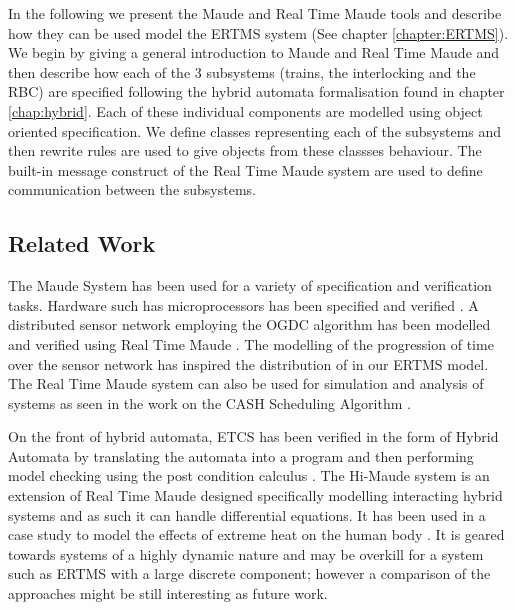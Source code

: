 \newcommand{\rtmaude}{Real Time Maude}


In the following we present the Maude \cite{MC03,Maude} and Real Time Maude \cite{PO02,PO04,RTMaude} tools and describe how they can be used model the ERTMS system (See chapter \ref{chapter:ERTMS}).   We begin by giving a general introduction to Maude and Real Time Maude and then describe how each of the 3 subsystems (trains, the interlocking and the RBC) are specified following the hybrid automata formalisation found in chapter \ref{chap:hybrid}. Each of these individual components are modelled using object oriented specification. We define classes representing each of the subsystems and then rewrite rules are used to give objects from these classses behaviour. The  built-in message construct of the Real Time Maude system are used to define communication between the subsystems.

\subsection*{Related Work}
The Maude System has been used for a variety of specification and verification tasks. Hardware such has microprocessors has been specified and verified \cite{NH00}. A distributed sensor network employing the OGDC algorithm has been modelled and verified using Real Time Maude \cite{PO07}. The modelling of the progression of time over the sensor network has inspired the distribution of in our ERTMS model. The Real Time Maude system can also be used for simulation and analysis of systems as seen in the work on the CASH Scheduling Algorithm \cite{PO06}. 

On the front of hybrid automata, ETCS has been verified in the form of Hybrid Automata by translating the automata into a program and then performing model checking using the post condition calculus \cite{DI13}. The Hi-Maude system \cite{MF11} is an extension of Real Time Maude designed specifically modelling interacting hybrid systems and as such it can handle differential equations. It has been used in a case study to model the effects of extreme heat on the human body \cite{MF12}. It is geared towards systems of a highly dynamic nature and may be overkill for a system such as ERTMS with a large discrete component; however a comparison of the approaches might be still interesting as future work.


